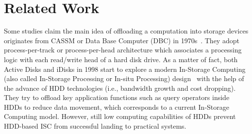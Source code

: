 
\section{Related Work}\label{sec:relatedWork}
Some studies claim the main idea of offloading a computation into storage devices originates from CASSM or Data Base Computer (DBC) in 1970s~\cite{CASSM:VLDB:1975,DBC:ISCA:1978}. They adopt process-per-track or process-per-head architecture which associates a processing logic with each read/write head of a hard disk drive. As a matter of fact, both Active Disks and iDisks in 1998 start to explore a modern In-Storage Computing (also called In-Storage Processing or In-situ Processing) design~\cite{ActiveDisks:ASPLOS:1998,Keeton1998} with the help of the advance of HDD technologies (i.e., bandwidth growth and cost dropping). They try to offload key application functions such as query operators inside HDDs to reduce data movement, which corresponds to a current In-Storage Computing model. However, still low computing capabilities of HDDs prevent HDD-based ISC from successful landing to practical systems.











